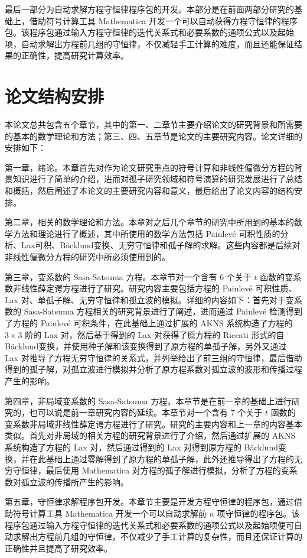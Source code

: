 最后一部分为自动求解方程守恒律程序包的开发。本部分是在前面两部分研究的基础上，借助符号计算工具 Mathematica 开发一个可以自动获得方程守恒律的程序包。该程序包通过输入方程守恒律的迭代关系式和必要系数的通项公式以及起始项，自动求解出方程前几组的守恒律，不仅减轻手工计算的难度，而且还能保证结果的正确性，提高研究计算效率。


\section{论文结构安排}
本论文总共包含五个章节，其中的第一、二章节主要介绍论文的研究背景和所需要的基本的数学理论和方法；第三、四、五章节是论文的主要研究内容。论文详细的安排如下：

第一章，绪论。本章首先对作为论文研究重点的符号计算和非线性偏微分方程的背景知识进行了简单的介绍，进而对孤子研究领域和符号演算的研究发展进行了总结和概括，然后阐述了本论文的主要研究内容和意义，最后给出了论文内容的结构安排。

第二章，相关的数学理论和方法。本章对之后几个章节的研究中所用到的基本的数学方法和理论进行了概述，其中所使用的数学方法包括 Painlev\'{e} 可积性质的分析、Lax可积、B\"{a}cklund变换、无穷守恒律和孤子解的求解。这些内容都是后续对非线性偏微分方程的研究中所必须使用到的。

第三章，变系数的 Sasa-Satsuma 方程。本章节对一个含有 6 个关于 $t$ 函数的变系数非线性薛定谔方程进行了研究。研究内容主要包括方程的 Painlev\'{e} 可积性质、Lax 对、单孤子解、无穷守恒律和孤立波的模拟。详细的内容如下：首先对于变系数的 Sasa-Satsuma 方程相关的研究背景进行了阐述，进而通过  Painlev\'{e} 检测得到了方程的  Painlev\'{e} 可积条件，在此基础上通过扩展的 AKNS 系统构造了方程的 $3 \times 3$ 阶的 Lax 对，然后基于得到的 Lax 对获得了原方程的 Riccati 形式的自 B\"{a}cklund变换，并使用种子解和该变换得到了原方程的单孤子解，另外又通过 Lax 对推导了方程无穷守恒律的关系式，并列举给出了前三组的守恒律，最后借助得到的孤子解，对孤立波进行模拟并分析了原方程系数对孤立波的波形和传播过程产生的影响。

第四章，非局域变系数的 Sasa-Satsuma 方程。本章节是在前一章的基础上进行研究的，也可以说是前一章研究内容的延续。本章节对一个含有 7 个关于 $t$ 函数的变系数非局域非线性薛定谔方程进行了研究。研究的主要内容和上一章的内容基本类似。首先对非局域的相关方程的研究背景进行了介绍，然后通过扩展的 AKNS 系统构造了方程的 Lax 对，然后通过得到的 Lax 对得到原方程的 B\"{a}cklund变换，并在此基础上通过零解得到了原方程的单孤子解，此外还推导得出了方程的无穷守恒律，最后使用 Mathematica 对方程的孤子解进行模拟，分析了方程的变系数对孤立波的传播所产生的影响。

第五章，守恒律求解程序包开发。本章节主要是开发方程守恒律的程序包，通过借助符号计算工具 Mathematica 开发一个可以自动求解前 $n$ 项守恒律的程序包。该程序包通过输入方程守恒律的迭代关系式和必要系数的通项公式以及起始项便可自动求解出方程前几组的守恒律，不仅减少了手工计算的复杂性，而且还保证计算的正确性并且提高了研究效率。












